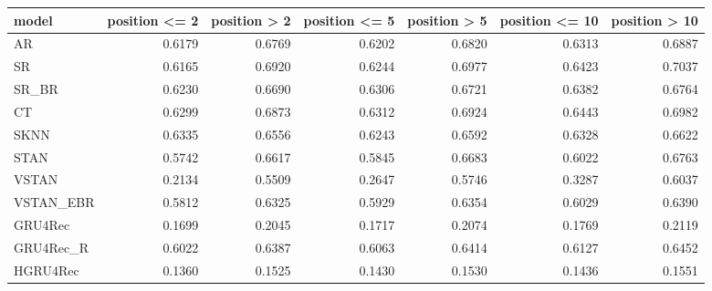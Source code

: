 \begin{tabular}{lrrrrrr}
\toprule
     model &  position <= 2 &  position > 2 &  position <= 5 &  position > 5 &  position <= 10 &  position > 10 \\
\midrule
        AR &         0.6179 &        0.6769 &         0.6202 &        0.6820 &          0.6313 &         0.6887 \\
        SR &         0.6165 &        0.6920 &         0.6244 &        0.6977 &          0.6423 &         0.7037 \\
     SR\_BR &         0.6230 &        0.6690 &         0.6306 &        0.6721 &          0.6382 &         0.6764 \\
        CT &         0.6299 &        0.6873 &         0.6312 &        0.6924 &          0.6443 &         0.6982 \\
      SKNN &         0.6335 &        0.6556 &         0.6243 &        0.6592 &          0.6328 &         0.6622 \\
      STAN &         0.5742 &        0.6617 &         0.5845 &        0.6683 &          0.6022 &         0.6763 \\
     VSTAN &         0.2134 &        0.5509 &         0.2647 &        0.5746 &          0.3287 &         0.6037 \\
 VSTAN\_EBR &         0.5812 &        0.6325 &         0.5929 &        0.6354 &          0.6029 &         0.6390 \\
   GRU4Rec &         0.1699 &        0.2045 &         0.1717 &        0.2074 &          0.1769 &         0.2119 \\
 GRU4Rec\_R &         0.6022 &        0.6387 &         0.6063 &        0.6414 &          0.6127 &         0.6452 \\
  HGRU4Rec &         0.1360 &        0.1525 &         0.1430 &        0.1530 &          0.1436 &         0.1551 \\
\bottomrule
\end{tabular}
